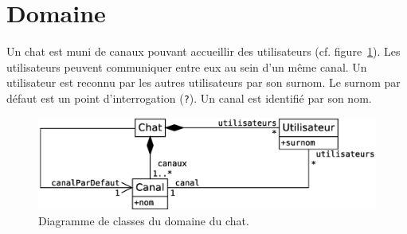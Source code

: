 %

\section{Domaine}
\label{sec:domaine}

Un chat est muni de canaux pouvant accueillir des utilisateurs (cf. figure~\ref{sec:domaine:figchat}). Les utilisateurs peuvent communiquer entre eux au sein d'un même canal. Un utilisateur est reconnu par les autres utilisateurs par son surnom. Le surnom par défaut est un point d'interrogation (\texttt{?}). Un canal est identifié par son nom.

\medskip
\begin{figure}[h!]
\begin{center}
\includegraphics[width=\linewidth]{../img/Chat_Domaine.eps}
\caption{Diagramme de classes du domaine du chat.}
\label{sec:domaine:figchat}
\end{center}
\end{figure}

